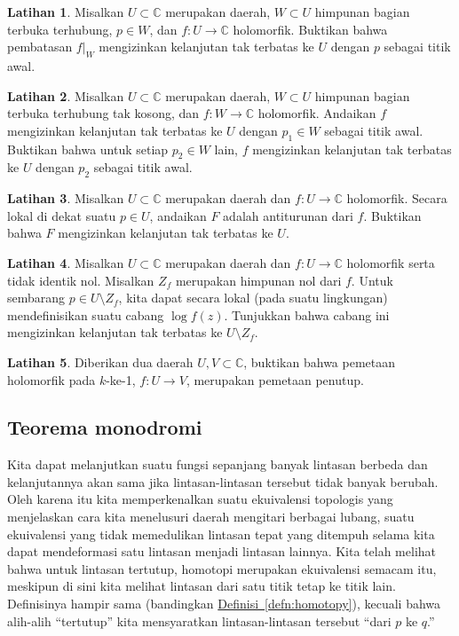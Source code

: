 \documentclass[12pt,openany]{book}
\newcommand{\C}{{\mathbb{C}}}
\newcommand{\myquote}[1]{``#1''}
\theoremstyle{plain}
\theoremstyle{remark}
\theoremstyle{definition}
\newenvironment{exbox}{%
    \def\FrameCommand{\vrule width 1pt \relax\hspace{10pt}}%
    \MakeFramed{\advance\hsize-\width\FrameRestore}%
}{%
    \endMakeFramed
}
\theoremstyle{exercise}
\newtheorem{exercise}{Latihan}[section]
\theoremstyle{example}
\newcommand{\defnref}[1]{\hyperref[#1]{Definisi~\ref*{#1}}}
\begin{document}
\begin{exbox}
\begin{exercise}
Misalkan $U \subset \C$ merupakan daerah, $W \subset U$ himpunan bagian terbuka terhubung,
$p \in W$, dan $f \colon U \to \C$ holomorfik.  Buktikan bahwa pembatasan
$f|_W$ mengizinkan kelanjutan tak terbatas ke $U$ dengan $p$ sebagai titik awal.
\end{exercise}

\begin{exercise}%
\label{exercise:startingpointcont}
Misalkan $U \subset \C$ merupakan daerah, $W \subset U$ himpunan bagian terbuka terhubung tak kosong,
dan $f \colon W \to \C$ holomorfik.  Andaikan $f$ mengizinkan kelanjutan tak
terbatas ke $U$ dengan $p_1 \in W$ sebagai titik awal.  Buktikan
bahwa untuk setiap $p_2 \in W$ lain, $f$ mengizinkan kelanjutan tak terbatas
ke $U$ dengan $p_2$ sebagai titik awal.
\end{exercise}

\begin{exercise}
Misalkan $U \subset \C$ merupakan daerah dan
$f \colon U \to \C$ holomorfik.  Secara lokal di dekat suatu $p \in U$,
andaikan $F$ adalah antiturunan dari $f$.  Buktikan bahwa $F$ mengizinkan kelanjutan tak terbatas
ke $U$.
\end{exercise}

\begin{exercise}
Misalkan $U \subset \C$ merupakan daerah dan $f \colon U \to \C$ holomorfik serta
tidak identik nol.  Misalkan $Z_f$ merupakan himpunan nol dari $f$.  Untuk sembarang $p
\in U \setminus Z_f$, kita dapat secara lokal (pada suatu lingkungan) mendefinisikan suatu cabang $\log f(z)$.
Tunjukkan bahwa cabang ini mengizinkan kelanjutan tak terbatas ke $U \setminus Z_f$.
\end{exercise}

\begin{exercise}
Diberikan dua daerah $U,V \subset \C$,
buktikan bahwa pemetaan holomorfik pada $k$-ke-1, $f \colon U \to V$, merupakan pemetaan penutup.
\end{exercise}
\end{exbox}

\subsection{Teorema monodromi}

Kita dapat melanjutkan suatu fungsi sepanjang banyak lintasan berbeda dan kelanjutannya
akan sama jika lintasan-lintasan tersebut tidak banyak berubah.  Oleh karena itu kita 
memperkenalkan suatu ekuivalensi topologis yang menjelaskan cara kita menelusuri daerah
mengitari berbagai lubang, suatu ekuivalensi yang tidak memedulikan lintasan tepat
yang ditempuh selama kita dapat mendeformasi satu lintasan menjadi lintasan lainnya.
Kita telah melihat bahwa untuk lintasan tertutup, homotopi merupakan ekuivalensi semacam itu, meskipun
di sini kita melihat lintasan dari satu titik tetap ke titik lain.  Definisinya
hampir sama (bandingkan \defnref{defn:homotopy}), kecuali bahwa alih-alih
\myquote{tertutup} kita mensyaratkan lintasan-lintasan tersebut
\myquote{dari $p$ ke $q$.}
\end{document}
